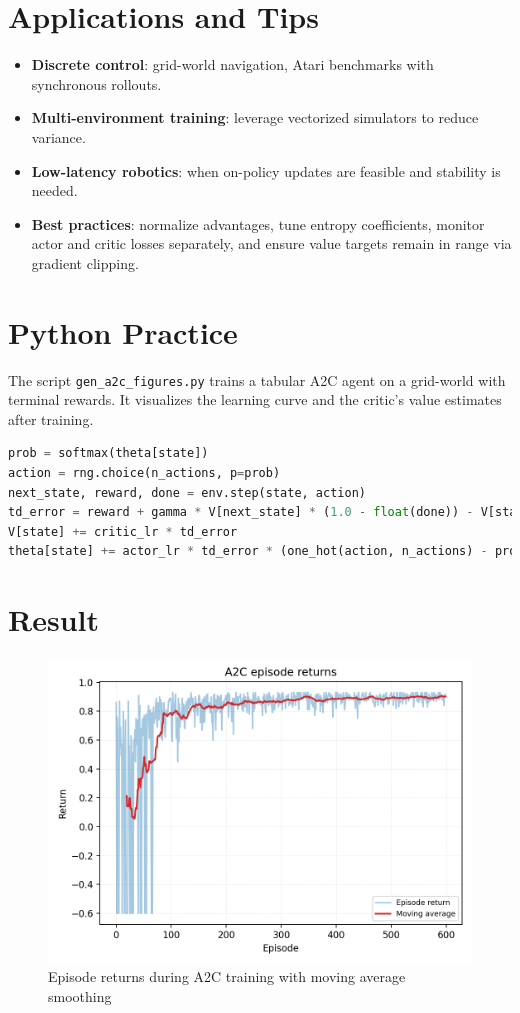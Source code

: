 ﻿\documentclass[12pt]{article}
\begin{document}
\section{Applications and Tips}
\begin{itemize}
  \item \textbf{Discrete control}: grid-world navigation, Atari benchmarks with synchronous rollouts.
  \item \textbf{Multi-environment training}: leverage vectorized simulators to reduce variance.
  \item \textbf{Low-latency robotics}: when on-policy updates are feasible and stability is needed.
  \item \textbf{Best practices}: normalize advantages, tune entropy coefficients, monitor actor and critic losses separately, and ensure value targets remain in range via gradient clipping.
\end{itemize}

\section{Python Practice}
The script \texttt{gen\_a2c\_figures.py} trains a tabular A2C agent on a grid-world with terminal rewards. It visualizes the learning curve and the critic's value estimates after training.
\begin{lstlisting}[language=Python,caption={Excerpt from gen_a2c_figures.py}]
prob = softmax(theta[state])
action = rng.choice(n_actions, p=prob)
next_state, reward, done = env.step(state, action)
td_error = reward + gamma * V[next_state] * (1.0 - float(done)) - V[state]
V[state] += critic_lr * td_error
theta[state] += actor_lr * td_error * (one_hot(action, n_actions) - prob)
\end{lstlisting}

\section{Result}
\begin{figure}[H]
  \centering
  \includegraphics[width=0.8\linewidth]{a2c_returns.png}
  \caption{Episode returns during A2C training with moving average smoothing}
  \label{fig:a2c_returns}
\end{figure}
\end{document}
